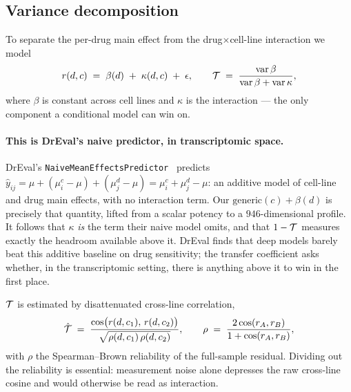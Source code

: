 \subsection{Variance decomposition}
\label{sec:methods-vardecomp}

To separate the per-drug main effect from the drug$\times$cell-line interaction we model
\begin{equation}
  r(d,c) \;=\; \beta(d) \;+\; \kappa(d,c) \;+\; \epsilon,
  \qquad
  \mathcal{T} \;=\; \frac{\operatorname{var}\beta}{\operatorname{var}\beta + \operatorname{var}\kappa},
\end{equation}
where $\beta$ is constant across cell lines and $\kappa$ is the interaction --- the only component a
conditional model can win on.

\paragraph{This is DrEval's naive predictor, in transcriptomic space.} DrEval's
\texttt{NaiveMeanEffectsPredictor}~\cite{dreval} predicts
$\hat{y}_{ij} = \mu + (\mu^c_i - \mu) + (\mu^d_j - \mu) = \mu^c_i + \mu^d_j - \mu$: an additive
model of cell-line and drug main effects, with no interaction term. Our
$\textrm{generic}(c) + \beta(d)$ is precisely that quantity, lifted from a scalar potency to a
$946$-dimensional profile. It follows that $\kappa$ \emph{is} the term their naive model omits, and
that $1 - \mathcal{T}$ measures exactly the headroom available above it. DrEval finds that deep models
barely beat this additive baseline on drug sensitivity; the transfer coefficient asks whether, in
the transcriptomic setting, there is anything above it to win in the first place.

$\mathcal{T}$ is estimated by disattenuated cross-line correlation,
\begin{equation}
  \hat{\mathcal{T}} \;=\; \frac{\cos\!\big(r(d,c_1),\, r(d,c_2)\big)}
                           {\sqrt{\rho(d,c_1)\,\rho(d,c_2)}},
  \qquad
  \rho \;=\; \frac{2\cos(r_A, r_B)}{1 + \cos(r_A, r_B)},
\end{equation}
with $\rho$ the Spearman--Brown reliability of the full-sample residual. Dividing out the
reliability is essential: measurement noise alone depresses the raw cross-line cosine and would
otherwise be read as interaction.

